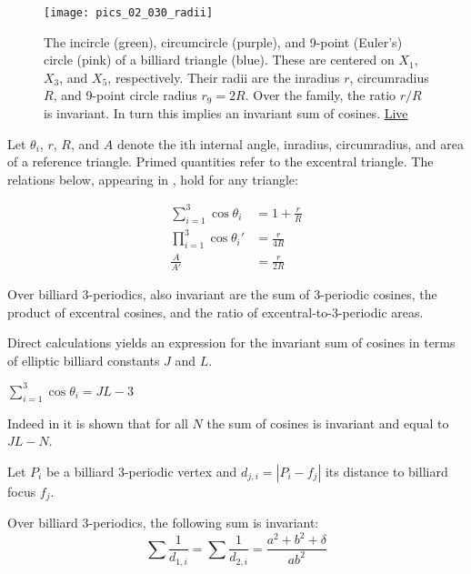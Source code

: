 \begin{figure}
    \centering
    \texttt{[image: pics\_02\_030\_radii]}
    \caption{The incircle (green), circumcircle (purple), and 9-point (Euler's) circle (pink) of a billiard triangle (blue). These are centered on $X_1$, $X_3$, and $X_5$, respectively. Their radii are the inradius $r$, circumradius $R$, and 9-point circle radius $r_9=2R$. Over the family, the ratio $r/R$ is invariant. In turn this implies an invariant sum of cosines. \href{https://bit.ly/337hvpf}{Live}}
    \label{fig:radii}
\end{figure}

Let $\theta_i$, $r$, $R$, and $A$ denote the ith internal angle, inradius, circumradius, and area of a reference triangle. Primed quantities refer to the excentral triangle. The relations below, appearing in  \cite{johnson1960},  hold for any triangle:

\begin{align}
\sum_{i=1}^{3}{\cos\theta_i}&=1+\frac{r}{R} \label{eqn:02-sum-cos} \\
\prod_{i=1}^{3}{\cos\theta_i'}&=\frac{r}{4R} \label{eqn:02-exc-prod-cos} \\
\frac{A}{A'}&=\frac{r}{2R} \label{eqn:02-area-ratio}
\end{align}

\begin{corollary}
Over billiard 3-periodics, also invariant are the sum of 3-periodic cosines, the product of excentral cosines, and the ratio of excentral-to-3-periodic areas.
\label{cor:02-rOvR}
\end{corollary}

Direct calculations yields an expression for the invariant sum of cosines in terms of elliptic billiard constants $J$ and $L$.

\begin{corollary}
$\sum_{i=1}^{3}{\cos\theta_i}=J L - 3$
\end{corollary}

Indeed in \cite{akopyan2020-invariants} it is shown that for all $N$ the sum of cosines is invariant and equal to $J L-N$.

Let $P_i$ be a billiard 3-periodic vertex and $d_{j,i}=|P_i-f_j|$ its distance to billiard focus $f_j$. 

\begin{proposition}
 Over billiard 3-periodics, the following sum is invariant:
\[  \sum\frac{1}{d_{1,i}}=\sum\frac{1}{d_{2,i}}=\frac {{a}^{2}+{b}^{2}+\delta}{a{b}^{
2}}
\]
\label{prop:02-confocal-inv-spokes}
\end{proposition}

